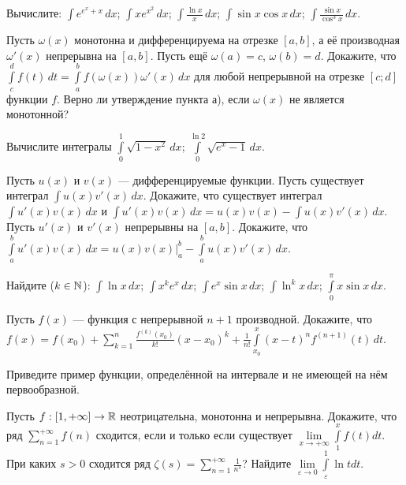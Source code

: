 \documentclass[a4paper, 11pt]{article}
\newcommand{\0}[1]{\overline{#1}}
\begin{document}
Вычислите:
 $\int e^{e^x+x}\, dx$;
 $\int xe^{x^2}\, dx$;
 $\int \frac{\ln x}{x}\, dx$;
 $\int \sin x \cos x \, dx$;
 $\int \frac{\sin x }{\cos^3 x }\, dx$.

Пусть $\omega (x)$ монотонна и дифференцируема на отрезке
$[a,b]$, а е\"е производная $\omega'(x)$ непрерывна на $[a,b]$.
Пусть ещё $\omega(a)=c$, $\omega(b)=d$.
Докажите, что $\int\limits_c^df(t)\, dt=
\int\limits_a^bf(\omega (x))\omega'(x)\, dx$ для любой непрерывной
на отрезке $[c;d]$ функции $f$.
Верно ли утверждение пункта а),
если $\omega(x)$ не является монотонной?

Вычислите интегралы
$\int\limits_0^1\sqrt{1-x^2}\, dx$;
$\int\limits_0^{\ln2}\sqrt{e^x-1}\, dx$.


Пусть $u(x)$ и $v(x)$ --- дифференцируемые функции.
Пусть существует интеграл $\int u(x)v'(x)\, dx$.
Докажите, что существует интеграл $\int u'(x)v(x)\, dx$ и
$\int u'(x)v(x)\, dx=u(x)v(x)-\int u(x)v'(x)\, dx.$\\
Пусть $u'(x)$ и $v'(x)$ непрерывны на $[a,b]$. Докажите, что
$
\int\limits_a^b u'(x)v(x)\, dx=u(x)v(x)\big|^b_a-
\int\limits_a^b u(x)v'(x)\, dx.
$

Найдите ($k\in\mathbb{N}$): %
 $\int \ln x \, dx$;
 $\int x^ke^x\, dx$; %
 $\int e^x\sin x \, dx$;
 $\int \ln^k x \, dx$; %
 $\int\limits_0^\pi x\sin x\, dx$.

 Пусть $f(x)$ --- функция с непрерывной $n+1$
производной. Докажите, что
$
f(x)=f(x_0)+\sum_{k=1}^n\frac{f^{(k)}(x_0)}{k!}(x-x_0)^k+
\frac{1}{n!}\int\limits_{x_0}^x(x-t)^nf^{(n+1)}(t)\, dt.
$


Приведите пример функции, определённой на интервале и не имеющей на нём первообразной.

 Пусть $f:[1,+\infty]\rightarrow \mathbb{R}$ неотрицательна, монотонна и непрерывна. Докажите, что ряд $\sum\limits_{n=1}^{+\infty}f(n)$ сходится, если и только если существует $\lim\limits_{x\to+\infty}\int\limits_1^x f(t) dt$.\\  При каких $s>0$ сходится ряд $\zeta (s)=\sum\limits_{n=1}^{+\infty}\frac1{n^s}$?  Найдите $\lim\limits_{\varepsilon\to0}\int\limits_{\varepsilon}^1 \ln t dt.$
\end{document}

